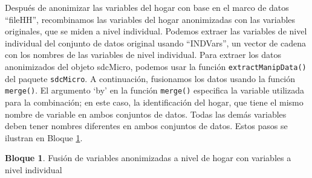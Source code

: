 \documentclass[
]{book}
\theoremstyle{definition}
\theoremstyle{definition}
\newtheorem{example}{Bloque}[chapter]
\theoremstyle{definition}
\theoremstyle{definition}
\theoremstyle{remark}
\begin{document}
Después de anonimizar las variables del hogar con base en el marco de datos ``fileHH'', recombinamos las variables del hogar anonimizadas con las variables originales, que se miden a nivel individual. Podemos extraer las variables de nivel individual del conjunto de datos original usando ``INDVars'', un vector de cadena con los nombres de las variables de nivel individual. Para extraer los datos anonimizados del objeto sdcMicro, podemos usar la función \texttt{extractManipData()} del paquete \texttt{sdcMicro}. A continuación, fusionamos los datos usando la función \texttt{merge()}. El argumento `by' en la función \texttt{merge()} especifica la variable utilizada para la combinación; en este caso, la identificación del hogar, que tiene el mismo nombre de variable en ambos conjuntos de datos. Todas las demás variables deben tener nombres diferentes en ambos conjuntos de datos. Estos pasos se ilustran en Bloque \ref{exm:bloqueMicro13}.

\begin{example}
\protect\hypertarget{exm:bloqueMicro13}{}\label{exm:bloqueMicro13}Fusión de variables anonimizadas a nivel de hogar con variables a nivel individual
\end{example}
\end{document}
